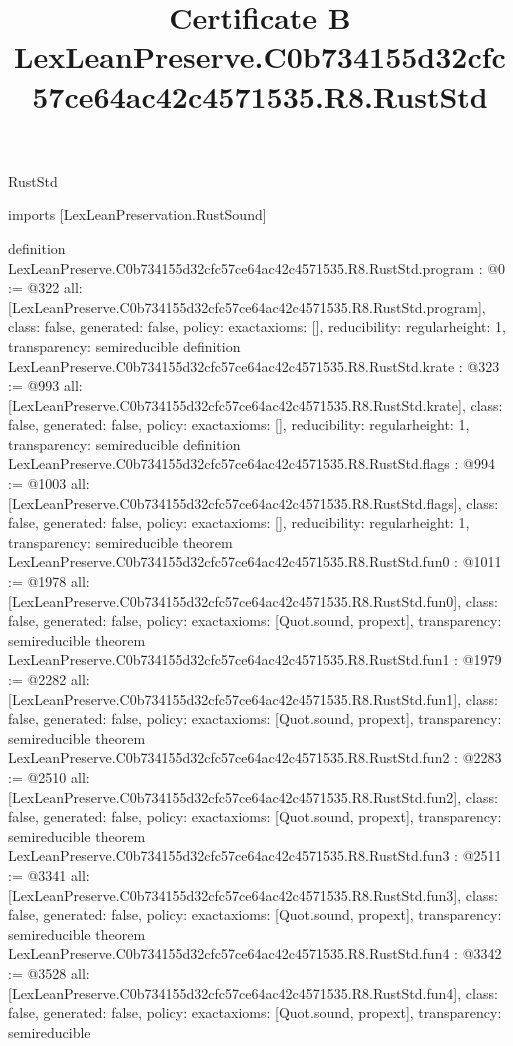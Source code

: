 \begin{lexlean}{RustStd}
\title{Certificate B LexLeanPreserve.C0b734155d32cfc57ce64ac42c4571535.R8.RustStd}
\begin{coremodule}
imports [LexLeanPreservation.RustSound]

definition LexLeanPreserve.C0b734155d32cfc57ce64ac42c4571535.R8.RustStd.program : @0 := @322 {
  all: [LexLeanPreserve.C0b734155d32cfc57ce64ac42c4571535.R8.RustStd.program],
  class: false,
  generated: false,
  policy: exact{axioms: []},
  reducibility: regular{height: 1},
  transparency: semireducible
}
definition LexLeanPreserve.C0b734155d32cfc57ce64ac42c4571535.R8.RustStd.krate : @323 := @993 {
  all: [LexLeanPreserve.C0b734155d32cfc57ce64ac42c4571535.R8.RustStd.krate],
  class: false,
  generated: false,
  policy: exact{axioms: []},
  reducibility: regular{height: 1},
  transparency: semireducible
}
definition LexLeanPreserve.C0b734155d32cfc57ce64ac42c4571535.R8.RustStd.flags : @994 := @1003 {
  all: [LexLeanPreserve.C0b734155d32cfc57ce64ac42c4571535.R8.RustStd.flags],
  class: false,
  generated: false,
  policy: exact{axioms: []},
  reducibility: regular{height: 1},
  transparency: semireducible
}
theorem LexLeanPreserve.C0b734155d32cfc57ce64ac42c4571535.R8.RustStd.fun0 : @1011 := @1978 {
  all: [LexLeanPreserve.C0b734155d32cfc57ce64ac42c4571535.R8.RustStd.fun0],
  class: false,
  generated: false,
  policy: exact{axioms: [Quot.sound, propext]},
  transparency: semireducible
}
theorem LexLeanPreserve.C0b734155d32cfc57ce64ac42c4571535.R8.RustStd.fun1 : @1979 := @2282 {
  all: [LexLeanPreserve.C0b734155d32cfc57ce64ac42c4571535.R8.RustStd.fun1],
  class: false,
  generated: false,
  policy: exact{axioms: [Quot.sound, propext]},
  transparency: semireducible
}
theorem LexLeanPreserve.C0b734155d32cfc57ce64ac42c4571535.R8.RustStd.fun2 : @2283 := @2510 {
  all: [LexLeanPreserve.C0b734155d32cfc57ce64ac42c4571535.R8.RustStd.fun2],
  class: false,
  generated: false,
  policy: exact{axioms: [Quot.sound, propext]},
  transparency: semireducible
}
theorem LexLeanPreserve.C0b734155d32cfc57ce64ac42c4571535.R8.RustStd.fun3 : @2511 := @3341 {
  all: [LexLeanPreserve.C0b734155d32cfc57ce64ac42c4571535.R8.RustStd.fun3],
  class: false,
  generated: false,
  policy: exact{axioms: [Quot.sound, propext]},
  transparency: semireducible
}
theorem LexLeanPreserve.C0b734155d32cfc57ce64ac42c4571535.R8.RustStd.fun4 : @3342 := @3528 {
  all: [LexLeanPreserve.C0b734155d32cfc57ce64ac42c4571535.R8.RustStd.fun4],
  class: false,
  generated: false,
  policy: exact{axioms: [Quot.sound, propext]},
  transparency: semireducible
}
\end{coremodule}
\end{lexlean}
